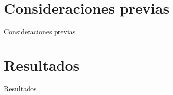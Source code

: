 \documentclass[spanish,a4paper]{beamer}%
\begin{document}
	\section{Consideraciones previas}
	\begin{frame}{Consideraciones previas}
		
	\end{frame}


\graphicspath{{./figuras/Resultados}}

	\section{Resultados}
	\begin{frame}{Resultados}
	\hypersetup{linkcolor=black}
		\tableofcontents[currentsubsection,hideothersubsections, 
    sectionstyle=hide,subsectionstyle=show/show/hide]
	\end{frame}
	
\end{document}
